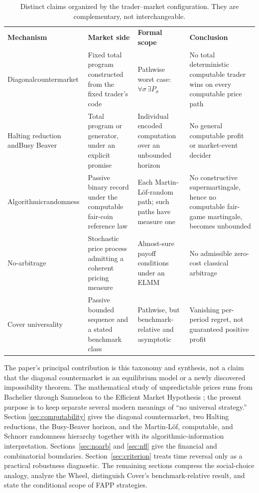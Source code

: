 \documentclass[aps,pra,reprint,superscriptaddress,amsmath,amssymb,floatfix]{revtex4-2}
\theoremstyle{plain}
\theoremstyle{definition}
\theoremstyle{remark}
\begin{document}
\begin{table}[t]
\caption{\label{tab:claimmap}Distinct claims organized by the trader--market
configuration. They are complementary, not interchangeable.}
\centering
\begin{ruledtabular}
\begin{tabular}{p{}p{}p{}p{}}
\textbf{Mechanism} & \textbf{Market side} & \textbf{Formal scope}
& \textbf{Conclusion} \\
\colrule
Diagonal\newline\mbox{countermarket}
& Fixed total program constructed from the fixed trader's code
& Pathwise worst case:
\(\forall\sigma\,\exists P_\sigma\)
& No total deterministic computable trader wins on every computable price path \\
Halting reduction and\newline Busy Beaver
& Total program or generator, under an explicit promise
& Individual encoded computation over an unbounded horizon
& No general computable profit or market-event decider \\
Algorithmic\newline randomness
& Passive binary record under the computable fair-coin reference law
& Each Martin-L\"of-random path; such paths have measure one
& No constructive supermartingale, hence no computable fair-game martingale,
becomes unbounded \\
No-arbitrage
& Stochastic price process admitting a coherent pricing measure
& Almost-sure payoff conditions under an ELMM
& No admissible zero-cost classical arbitrage \\
Cover universality
& Passive bounded sequence and a stated benchmark class
& Pathwise, but benchmark-relative and asymptotic
& Vanishing per-period regret, not guaranteed positive profit \\
\end{tabular}
\end{ruledtabular}
\end{table}

The paper's principal contribution is this taxonomy and synthesis, not a claim
that the diagonal countermarket is an equilibrium model or a newly discovered
impossibility theorem. The mathematical study of unpredictable prices
runs from Bachelier through Samuelson to the Efficient Market Hypothesis
\cite{Bachelier1900,Samuelson1965,Fama1970}; the present purpose is to keep
separate several modern meanings of ``no universal strategy.'' Section
\ref{sec:computability} gives the diagonal countermarket, two Halting reductions,
the Busy-Beaver horizon, and the Martin-L\"of, computable, and Schnorr
randomness hierarchy together with its algorithmic-information interpretation.
Sections~\ref{sec:noarb} and \ref{sec:nfl} give the financial and combinatorial
boundaries. Section~\ref{sec:criterion} treats time reversal only as a practical
robustness diagnostic. The remaining sections compress the social-choice
analogy, analyze the Wheel, distinguish Cover's benchmark-relative result, and
state the conditional scope of FAPP strategies.
\end{document}
